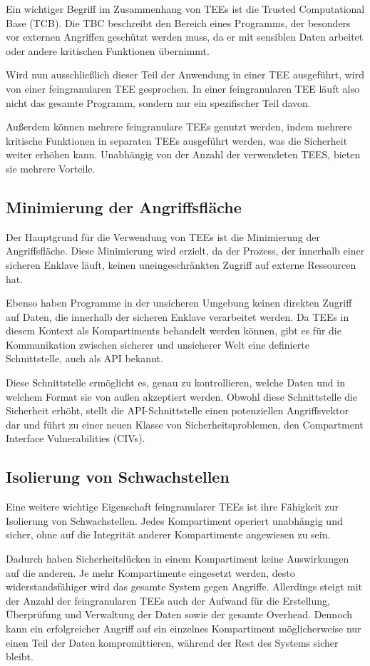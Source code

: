 Ein wichtiger Begriff im Zusammenhang von TEEs ist die Trusted Computational Base (TCB). Die TBC beschreibt den Bereich eines Programms, der besonders vor externen Angriffen geschützt werden muss, da er mit sensiblen Daten arbeitet oder andere kritischen Funktionen übernimmt. 

Wird nun ausschließlich dieser Teil der Anwendung in einer TEE ausgeführt, wird von einer feingranularen TEE gesprochen. In einer feingranularen TEE läuft also nicht das gesamte Programm, sondern nur ein spezifischer Teil davon. 

Außerdem können mehrere feingranulare TEEs genutzt werden, indem mehrere kritische Funktionen in separaten TEEs ausgeführt werden, was die Sicherheit weiter erhöhen kann. Unabhängig von der Anzahl der verwendeten TEES, bieten sie mehrere Vorteile.

\subsection{Minimierung der Angriffsfläche}
Der Hauptgrund für die Verwendung von TEEs ist die Minimierung der Angriffsfläche. Diese Minimierung wird erzielt, da der Prozess, der innerhalb einer sicheren Enklave läuft, keinen uneingeschränkten Zugriff auf externe Ressourcen hat. 

Ebenso haben Programme in der unsicheren Umgebung keinen direkten Zugriff auf Daten, die innerhalb der sicheren Enklave verarbeitet werden. Da TEEs in diesem Kontext als Kompartiments behandelt werden können, gibt es für die Kommunikation zwischen sicherer und unsicherer Welt eine definierte Schnittstelle, auch als API bekannt. 

Diese Schnittstelle ermöglicht es, genau zu kontrollieren, welche Daten und in welchem Format sie von außen akzeptiert werden. Obwohl diese Schnittstelle die Sicherheit erhöht, stellt die API-Schnittstelle einen potenziellen Angriffsvektor dar und führt zu einer neuen Klasse von Sicherheitsproblemen, den Compartment Interface Vulnerabilities (CIVs).

\subsection{Isolierung von Schwachstellen}
Eine weitere wichtige Eigenschaft feingranularer TEEs ist ihre Fähigkeit zur Isolierung von Schwachstellen. Jedes Kompartiment operiert unabhängig und sicher, ohne auf die Integrität anderer Kompartimente angewiesen zu sein. 

Dadurch haben Sicherheitslücken in einem Kompartiment keine Auswirkungen auf die anderen. Je mehr Kompartimente eingesetzt werden, desto widerstandsfähiger wird das gesamte System gegen Angriffe. Allerdings steigt mit der Anzahl der feingranularen TEEs auch der Aufwand für die Erstellung, Überprüfung und Verwaltung der Daten sowie der gesamte Overhead. Dennoch kann ein erfolgreicher Angriff auf ein einzelnes Kompartiment möglicherweise nur einen Teil der Daten kompromittieren, während der Rest des Systems sicher bleibt.

